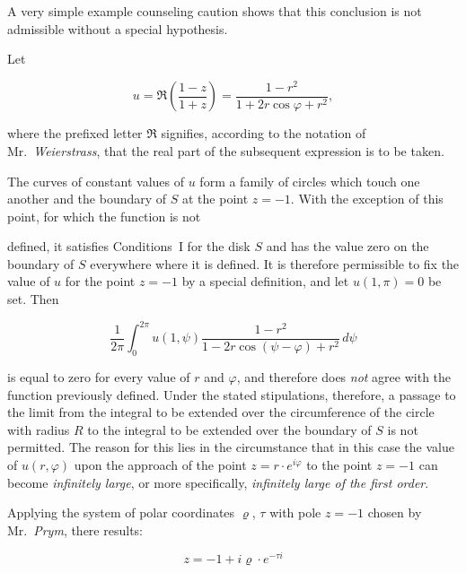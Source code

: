 \documentclass{article}
\begin{document}
A very simple example counseling caution shows that this conclusion is not admissible without a special hypothesis.



Let

\[

u = \Re\left(\frac{1 - z}{1 + z}\right) = \frac{1 - r^2}{1 + 2r \cos\varphi + r^2},

\]

where the prefixed letter $\Re$ signifies, according to the notation of Mr.~\emph{Weierstrass}, that the real part of the subsequent expression is to be taken.



The curves of constant values of $u$ form a family of circles which touch one another and the boundary of $S$ at the point $z = -1$. With the exception of this point, for which the function is not




defined, it satisfies Conditions~I for the disk $S$ and has the value zero on the boundary of $S$ everywhere where it is defined. It is therefore permissible to fix the value of $u$ for the point $z = -1$ by a special definition, and let $u(1, \pi) = 0$ be set. Then

\[

\frac{1}{2\pi} \int_0^{2\pi} u(1, \psi) \frac{1 - r^2}{1 - 2r \cos(\psi - \varphi) + r^2}\,d\psi

\]

is equal to zero for every value of $r$ and $\varphi$, and therefore does \emph{not} agree with the function previously defined. Under the stated stipulations, therefore, a passage to the limit from the integral to be extended over the circumference of the circle with radius $R$ to the integral to be extended over the boundary of $S$ is not permitted. The reason for this lies in the circumstance that in this case the value of $u(r, \varphi)$ upon the approach of the point $z = r \cdot e^{i\varphi}$ to the point $z = -1$ can become \emph{infinitely large}, or more specifically, \emph{infinitely large of the first order}.



Applying the system of polar coordinates $\varrho$, $\tau$ with pole $z = -1$ chosen by Mr.~\emph{Prym}, there results:

\[

z = -1 + i\varrho \cdot e^{-\tau i}

\]
\end{document}
